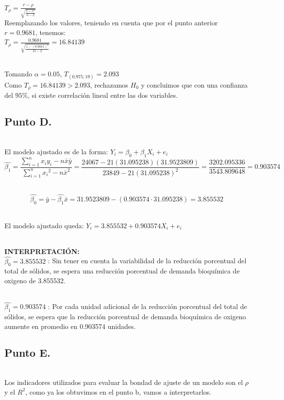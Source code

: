 \documentclass[letterpaper,12pt,onecolumn,titlepage]{article}
\begin{document}
~\\ $T_{\rho}=\frac{r-\rho}{\sqrt{\frac{1-r^2}{n-2}}}$
~\\ Reemplazando los valores, teniendo en cuenta que por el punto anterior $r=0.9681$, tenemos:
~\\ $T_{\rho}=\frac{0.9681}{\sqrt{\frac{1-(0.9681)^2}{21-2}}}=16.84139$

~\\ Tomando $\alpha=0.05$, $T_{(0.975;19)}=2.093$
~\\ Como $T_{\rho}=16.84139>2.093$, rechazamos $H_{0}$ y concluimos que con una confianza del $95\%$, si existe correlaci\'{o}n lineal entre las dos variables.  
\subsection{Punto D.}
~\\ El modelo ajustado es de la forma: $Y_{i}=\beta_{0}+\beta_{1}X_{i}+e_{i}$
~\\ $$\hat{\beta_{1}}=\frac{\sum\limits_{i=1}^{n}x_{i}y_{i}-n\bar{x}\bar{y}}{\sum\limits_{i=1}^{n}{x_{i}}^2 - n\bar{x}^2}=\frac{24067-21(31.095238)(31.9523809)}{23849-21(31.095238)^2}=\frac{3202.095336}{3543.809648}=0.903574$$

~\\ $$\hat{\beta_{0}}=\bar{y}-\hat{\beta_{1}}\bar{x}=31.9523809-(0.903574\cdot 31.095238)=3.855532$$

~\\ El modelo ajustado queda: $Y_{i}=3.855532+0.903574 X_{i}+ e_{i}$

~\\ \textbf{INTERPRETACI\'{O}N:}
~\\ $\hat{\beta_{0}}=3.855532$ : Sin tener en cuenta la variabilidad de la reducci\'{o}n porcentual del total de s\'{o}lidos, se espera una reducci\'{o}n porcentual de demanda bioqu\'{i}mica de oxigeno de 3.855532.

~\\ $\hat{\beta_{1}}=0.903574$ : Por cada unidad adicional de la reducci\'{o}n porcentual del total de s\'{o}lidos, se espera que la reducci\'{o}n porcentual de demanda bioqu\'{i}mica de oxigeno aumente en promedio en 0.903574 unidades.

\pagebreak\subsection{Punto E.}
~\\ Los indicadores utilizados para evaluar la bondad de ajuste de un modelo son el $\rho$ y el $R^2$, como ya los obtuvimos en el punto b, vamos a interpretarlos.
\end{document}
